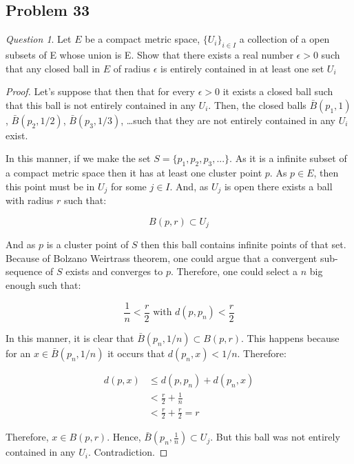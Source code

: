 \documentclass[11pt]{article}
\theoremstyle{definition}
\theoremstyle{remark}
\theoremstyle{remark}
\newtheorem{question}{Question}
\begin{document}
\subsection{Problem 33}
\begin{question}
  Let $E$ be a compact metric space, $\{U_i\}_{i \in I}$ a collection
  of a open subsets of E whose union is E. Show that there exists a
  real number $\epsilon > 0 $ such that any closed ball in $E$ of
  radius $\epsilon$ is entirely contained in at least one set $U_i$
\end{question}

\begin{proof}
  Let's suppose that then that for every $\epsilon > 0$ it exists a
  closed ball such that this ball is not entirely contained in any
  $U_i$. Then, the closed balls $\bar{B}(p_1, 1)$,
  $\bar{B}(p_2, 1/2)$, $\bar{B}(p_3, 1/3)$, \dots such that they are
  not entirely contained in any $U_i$ exist.

  In this manner, if we make the set $S = \{p_1, p_2, p_3, ...\}$. As
  it is a infinite subset of a compact metric space then it has at
  least one cluster point $p$. As $p \in E$, then this point must be
  in $U_j$ for some $j \in I$. And, as $U_j$ is open there exists a
  ball with radius $r$ such that:

  \begin{equation}
    B(p, r) \subset U_j
  \end{equation}

  And as $p$ is a cluster point of $S$ then this ball contains
  infinite points of that set. Because of Bolzano Weirtrass theorem,
  one could argue that a convergent sub-sequence of $S$ exists and
  converges to $p$. Therefore, one could select a $n$ big enough such
  that:

  \begin{equation}
    \frac{1}{n} < \frac{r}{2} \text{ with } d(p, p_n)< \frac{r}{2}
  \end{equation}

  In this manner, it is clear that
  $\bar{B}(p_n, 1/n) \subset B(p, r)$. This happens because for an
  $x \in \bar{B}(p_n, 1/n)$ it occurs that $d(p_n, x) <
  1/n$. Therefore:

  \begin{equation}
    \begin{split}
      d(p, x) &\le d(p, p_n) + d(p_n, x) \\
      &< \frac{r}{2} + \frac{1}{n} \\
      &< \frac{r}{2} + \frac{r}{2} = r
    \end{split}
  \end{equation}

  Therefore, $x \in B(p, r)$. Hence,
  $\bar{B}(p_n, \frac{1}{n}) \subset U_j$. But this ball was not
  entirely contained in any $U_i$. Contradiction.
\end{proof}
\end{document}
